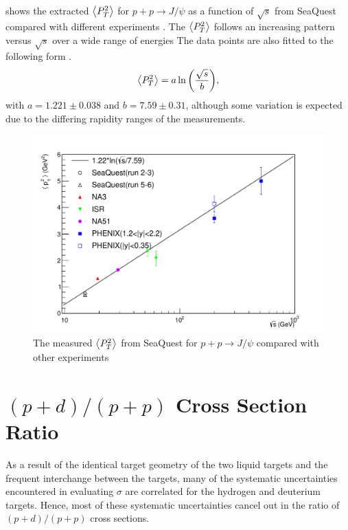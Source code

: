 \documentclass[reprint,aps,unsortedaddress,superscriptaddress,prd,floatfix,showpacs,linenumbers]{revtex4-2}
\begin{document}
 shows the extracted $\expval{P_T^2}$ for $p+p\to J/\psi$ as a function
of $\sqrt{s}$ from SeaQuest compared with different experiments
\cite{badier1983,clark1978,drapier1998,acharya2020}. The $\expval{P_T^2}$ follows an
increasing pattern versus $\sqrt{s}$ over a wide range of energies
The data points are also fitted to the following form \cite{acharya2020}.
\begin{equation}
	\expval{P_T^2}=a\ln{\left( \frac{\sqrt{s}}{b} \right)},
\end{equation}
with $a=1.221\pm0.038$ and $b=7.59\pm0.31$, although some variation is
expected due to the differing rapidity ranges of the measurements.
\begin{figure}
	\centering
	\includegraphics[width=\linewidth]{crossSections/pT/pT_s_release}
	\caption{The measured $\expval{P_T^2}$ from SeaQuest for $p+p\to J/\psi$ compared with other experiments \cite{clark1978,drapier1998,acharya2020}}
	\label{fig:pt_s}
\end{figure}

\section{$(p+d)/(p+p)$ Cross Section Ratio}
\label{sec:CSR}
As a result of the identical target geometry
of the two liquid targets and the frequent interchange between the targets,
many of the systematic uncertainties encountered in evaluating $\sigma$
are correlated for the hydrogen and deuterium targets. Hence, most of these
systematic uncertainties cancel out in the ratio of $(p+d)/(p+p)$ cross
sections.
\end{document}
